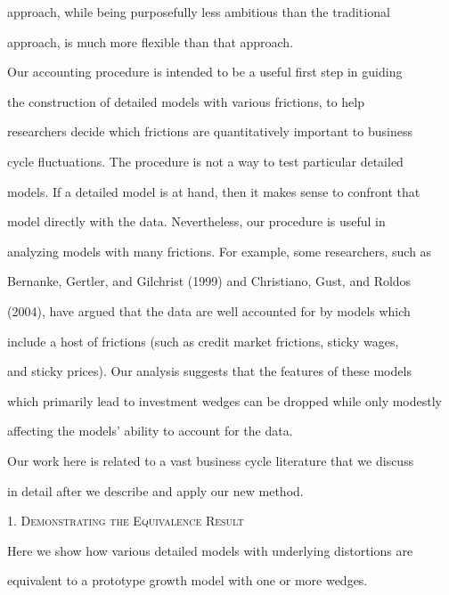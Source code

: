 \documentclass[fleqn,leqno,11pt]{article}
\begin{document}
approach, while being purposefully less ambitious than the traditional

approach, is much more flexible than that approach.



Our accounting procedure is intended to be a useful first step in guiding

the construction of detailed models with various frictions, to help

researchers decide which frictions are quantitatively important to business

cycle fluctuations. The procedure is not a way to test particular detailed

models. If a detailed model is at hand, then it makes sense to confront that

model directly with the data. Nevertheless, our procedure is useful in

analyzing models with many frictions. For example, some researchers, such as

Bernanke, Gertler, and Gilchrist (1999) and Christiano, Gust, and Roldos

(2004), have argued that the data are well accounted for by models which

include a host of frictions (such as credit market frictions, sticky wages,

and sticky prices). Our analysis suggests that the features of these models

which primarily lead to investment wedges can be dropped while only modestly

affecting the models' ability to account for the data.



Our work here is related to a vast business cycle literature that we discuss

in detail after we describe and apply our new method.



\bigskip



\begin{center}

1. \textsc{Demonstrating the Equivalence Result}

\end{center}



Here we show how various detailed models with underlying distortions are

equivalent to a prototype growth model with one or more wedges.
\end{document}

